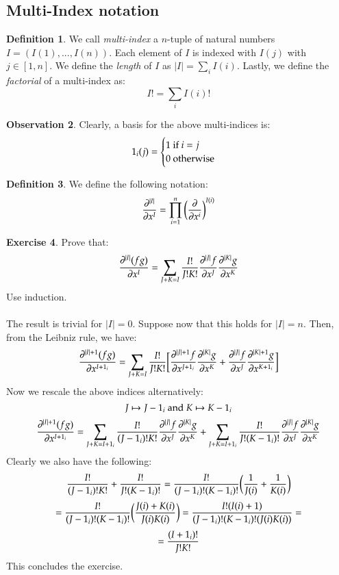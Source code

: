 \documentclass[12pt,a4paper]{report}
\theoremstyle{definition}
\newtheorem{Def}{Definition}[chapter]
\theoremstyle{Theorem}
\theoremstyle{break}
\newtheorem{Exe}[Def]{Exercise}
\theoremstyle{definition}
\newtheorem{Obs}[Def]{Observation}
\begin{document}
	\subsection{Multi-Index notation}
	\begin{Def}
		We call \textit{multi-index} a $n$-tuple of natural numbers $I=(I(1),...,I(n))$. Each element of $I$ is indexed with $I(j)$ with $j\in [1,n]$. We define the \textit{length} of $I$ as $|I|=\sum_i I(i)$. Lastly, we define the \textit{factorial} of a multi-index as:
		$$I!=\sum_{i}I(i)!$$
	\end{Def}
	\begin{Obs}
		Clearly, a basis for the above multi-indices is:
		$$1_i(j)=\begin{cases}
			1 \hbox{ if } i=j\\
			0 \hbox{ otherwise}
		\end{cases}$$
	\end{Obs}
	\begin{Def}
		We define the following notation:
		$${\partial^{|I|}\over \partial x^I}=\prod_{i=1}^n\bigg({\partial \over \partial x^i}\bigg)^{I(i)}$$
	\end{Def}
	\begin{Exe}
		Prove that:
		$${\partial^{|I|}(fg)\over \partial x^I}=\sum_{J+K=I} {I!\over J!K!}{\partial^{|J|}f\over \partial x^J}{\partial^{|K|}g\over \partial x^K}$$
		Use induction.\\
		\\
		The result is trivial for $|I|=0$. Suppose now that this holds for $|I|=n$. Then, from the Leibniz rule, we have:
		$${\partial^{|I|+1}(fg)\over \partial x^{I+1_i}}=\sum_{J+K=I} {I!\over J!K!}\bigg[{\partial^{|J|+1}f\over \partial x^{J+1_i}}{\partial^{|K|}g\over \partial x^{K}}+{\partial^{|J|}f\over \partial x^{J}}{\partial^{|K|+1}g\over \partial x^{K+1_i}}\bigg]$$
		Now we rescale the above indices alternatively: 
		$$J\mapsto J-1_i\hbox{ and }K\mapsto K-1_i$$
		$${\partial^{|I|+1}(fg)\over \partial x^{I+1_i}}=\sum_{J+K=I+1_i} {I!\over (J-1_i)!K!}{\partial^{|J|}f\over \partial x^{J}}{\partial^{|K|}g\over \partial x^{K}}+\sum_{J+K=I+1_i}{I!\over J!(K-1_i)!}{\partial^{|J|}f\over \partial x^{J}}{\partial^{|K|}g\over \partial x^{K}}$$
		Clearly we also have the following:
		$${I!\over (J-1_i)!K!}+{I!\over J!(K-1_i)!}={I!\over (J-1_i)!(K-1_i)!}\bigg({1\over J(i)}+{1\over K(i)}\bigg)$$
		$$={I!\over (J-1_i)!(K-1_i)!}\bigg({J(i)+K(i)\over J(i)K(i)}\bigg)={I!(I(i)+1)\over (J-1_i)!(K-1_i)!(J(i)K(i))}=$$
		$$={(I+1_i)!\over J!K!}$$
		This concludes the exercise.
	\end{Exe}
\end{document}
